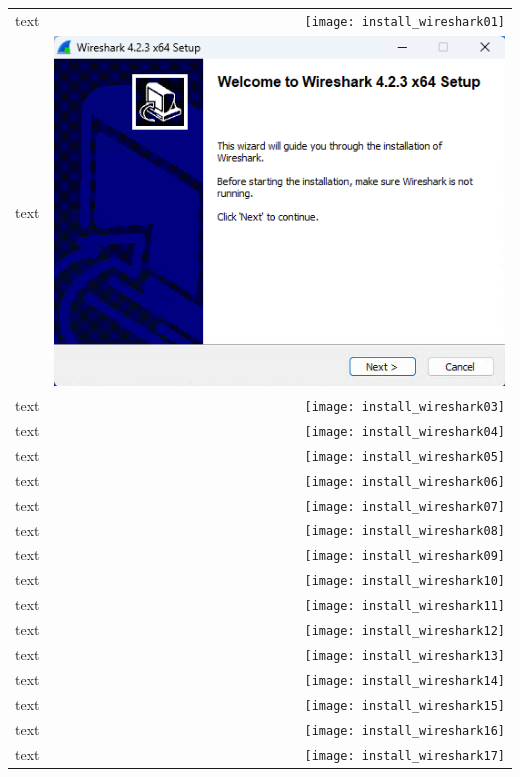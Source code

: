 \documentclass[11pt,a4paper]{report}
\begin{document}
\begin{tabular}{ l r }
            text & \texttt{[image: install\_wireshark01]} \\
            text & \includegraphics[scale=1.0]{install_wireshark02} \\
            text & \texttt{[image: install\_wireshark03]} \\
            text & \texttt{[image: install\_wireshark04]} \\
            text & \texttt{[image: install\_wireshark05]} \\
            text & \texttt{[image: install\_wireshark06]} \\
            text & \texttt{[image: install\_wireshark07]} \\
            text & \texttt{[image: install\_wireshark08]} \\
            text & \texttt{[image: install\_wireshark09]} \\
            text & \texttt{[image: install\_wireshark10]} \\
            text & \texttt{[image: install\_wireshark11]} \\
            text & \texttt{[image: install\_wireshark12]} \\
            text & \texttt{[image: install\_wireshark13]} \\
            text & \texttt{[image: install\_wireshark14]} \\
            text & \texttt{[image: install\_wireshark15]} \\
            text & \texttt{[image: install\_wireshark16]} \\
            text & \texttt{[image: install\_wireshark17]} \\

\end{tabular}
\end{document}
